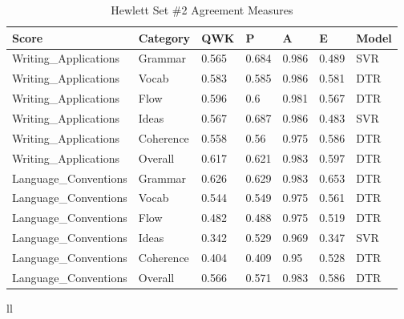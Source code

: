 \begin{table}[h]
\centering
\begin{tabular}{@{}lllllll@{}}
\toprule
Score                 & Category  & QWK   & P     & A     & E     & Model \\ \midrule
Writing\_Applications & Grammar   & 0.565 & 0.684 & 0.986 & 0.489 & SVR   \\
Writing\_Applications & Vocab     & 0.583 & 0.585 & 0.986 & 0.581 & DTR   \\
Writing\_Applications & Flow      & 0.596 & 0.6   & 0.981 & 0.567 & DTR   \\
Writing\_Applications & Ideas     & 0.567 & 0.687 & 0.986 & 0.483 & SVR   \\
Writing\_Applications & Coherence & 0.558 & 0.56  & 0.975 & 0.586 & DTR   \\
Writing\_Applications & Overall   & 0.617 & 0.621 & 0.983 & 0.597 & DTR   \\
Language\_Conventions & Grammar   & 0.626 & 0.629 & 0.983 & 0.653 & DTR   \\
Language\_Conventions & Vocab     & 0.544 & 0.549 & 0.975 & 0.561 & DTR   \\
Language\_Conventions & Flow      & 0.482 & 0.488 & 0.975 & 0.519 & DTR   \\
Language\_Conventions & Ideas     & 0.342 & 0.529 & 0.969 & 0.347 & SVR   \\
Language\_Conventions & Coherence & 0.404 & 0.409 & 0.95  & 0.528 & DTR   \\
Language\_Conventions & Overall   & 0.566 & 0.571 & 0.983 & 0.586 & DTR   \\ \bottomrule
\end{tabular}
\caption{Hewlett Set \#2 Agreement Measures}
\end{table}

ll

